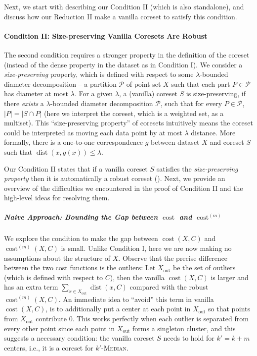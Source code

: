 \documentclass[letterpaper,11pt]{article}
\theoremstyle{plain}
\theoremstyle{definition}
\theoremstyle{remark}
\DeclareMathOperator{\cost}{cost}
\DeclareMathOperator{\dist}{dist}
\newcommand{\out}{\mathrm{out}}
\begin{document}
Next, we start with describing our Condition II (which is also standalone), and discuss how our Reduction II make a vanilla coreset to satisfy this condition. 

















\paragraph{Condition II: Size-preserving Vanilla Coresets Are Robust} 
The second condition requires a stronger property in the definition of the coreset (instead of the dense property in the dataset as in Condition I).
We consider a \emph{size-preserving} property, which is defined with respect to some $\lambda$-bounded diameter decomposition -- a partition $\mathcal{P}$ of point set $X$ such that each part $P \in \mathcal{P}$ has diameter at most $\lambda$.
For a given $\lambda$, a (vanilla) coreset $S$ is size-preserving, if there \emph{exists} a $\lambda$-bounded diameter decomposition $\mathcal{P}$, such that for every $P \in \mathcal{P}$, $|P| = |S \cap P|$
(here we interpret the coreset, which is a weighted set, as a multiset).
This ``size-preserving property'' of coresets intuitively means the coreset could be interpreted as
moving each data point by at most $\lambda$ distance.
More formally, there is a one-to-one correspondence $g$ between dataset $X$ and coreset $S$ 
such that $\dist(x, g(x)) \leq \lambda$.

Our Condition II states that if a vanilla coreset $S$ satisfies the \emph{size-preserving property} then it is automatically a robust coreset ().
Next, we provide an overview of the difficulties we encountered in the proof of Condition II and the high-level ideas for resolving them.


\subparagraph{Naive Approach: Bounding the Gap between $\cost$ and $\cost^{(m)}$}

We explore the condition to make the gap between $\cost(X, C)$ and $\cost^{(m)}(X, C)$ is small.
Unlike Condition I, here we are now making no assumptions about the structure of $X$.
Observe that the precise difference between the two cost functions is the outliers:
Let $X_{\out}$ be the set of outliers (which is defined with respect to $C$),
then the vanilla $\cost(X, C)$ is larger and has an extra term $\sum_{x \in X_{\out}} \dist(x, C)$ compared with the robust $\cost^{(m)}(X, C)$.
An immediate idea to ``avoid'' this term in vanilla $\cost(X, C)$,
is to additionally put a center at each point in $X_{\out}$
so that points from $X_{\out}$ contribute $0$.
This works perfectly when each outlier is separated from every other point since each point in $X_{\out}$ forms a singleton cluster,
and this suggests a necessary condition:
the vanilla coreset $S$ needs to hold for $k' = k + m$ centers, i.e., it is a coreset for $k'$-\textsc{Median}.
\end{document}
